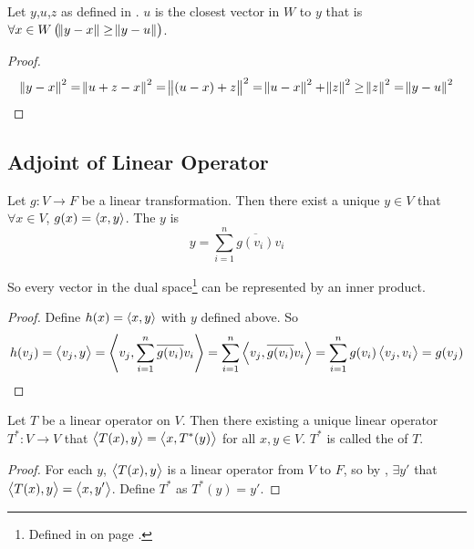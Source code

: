 \begin{theorem}
    Let $y$,$u$,$z$ as defined in . $u$ is the closest vector in $W$ to $y$ that is $\forall x \in W \left(\norm{y-x} \geq \norm{y - u} \right)$.
\end{theorem}
\begin{proof}
    \begin{equation*}
        \norm{y - x}^2 = \norm{u + z - x}^2 = \norm{(u - x) + z}^2 = \norm{u - x}^2 + \norm{z}^2 \geq \norm{z}^2 = \norm{y - u}^2
    \end{equation*}
\end{proof}







\subsection{Adjoint of Linear Operator}

\begin{theorem}\label{uniquelinearoperatortof}
    Let $g: V \rightarrow F$ be a linear transformation. Then there exist a unique $y \in V$ that $\forall x \in V$, $g(x) = \left\langle \displaystyle x, y \right\rangle$. The $y$ is 
    \begin{equation}
        y = \sum_{i=1}^n \overline{g(v_i)} v_i
    \end{equation}
    
    So every vector in the dual space\footnote{Defined in  on page \pageref{dualspacedefinition}.} can be represented by an inner product.
\end{theorem}
\begin{proof}
    Define $h(x) = \left\langle \displaystyle x, y \right\rangle$ with $y$ defined above. So
    \begin{equation*}
        h(v_j) = \left\langle \displaystyle v_j, y \right\rangle = \left\langle \displaystyle v_j, \sum_{i=1}^n \overline{g(v_i)} v_i \right\rangle = \sum_{i=1}^n \left\langle \displaystyle v_j, \overline{g(v_i)} v_i \right\rangle = \sum_{i=1}^n g(v_i) \left\langle \displaystyle v_j,  v_i \right\rangle = g(v_j)
    \end{equation*}
\end{proof}



\begin{theorem}
    Let $T$ be a linear operator on $V$. Then there existing a unique linear operator $T^* : V \rightarrow V$ that $\left\langle \displaystyle T(x), y \right\rangle=\left\langle \displaystyle x, T^*(y) \right\rangle$ for all $x,y \in V$. $T^*$ is called the  of $T$.
\end{theorem}
\begin{proof}
    For each $y$, $\left\langle \displaystyle T(x), y \right\rangle$ is a linear operator from $V$ to $F$, so by , $\exists y'$ that $\left\langle \displaystyle T(x), y \right\rangle = \left\langle \displaystyle x, y' \right\rangle$. Define $T^*$ as $T^*(y) = y'$.
\end{proof}

